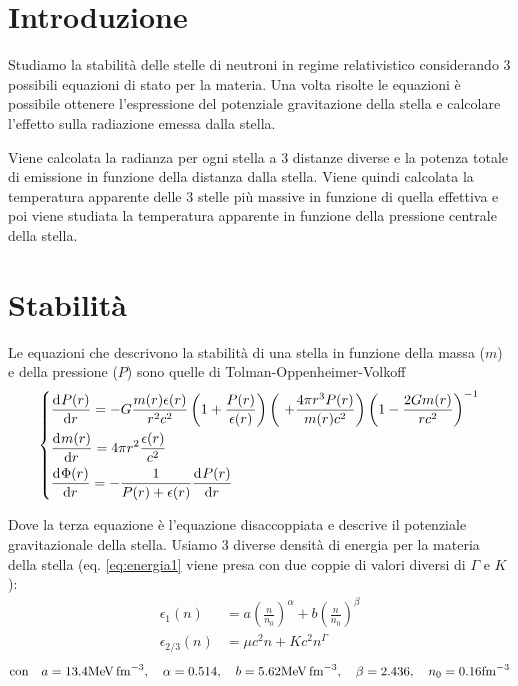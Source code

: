 \documentclass[a4paper, titlepage]{article}
\begin{document}
\section{Introduzione}
Studiamo la stabilità delle stelle di neutroni in regime relativistico considerando 3 possibili equazioni di stato per la materia.
Una volta risolte le equazioni è possibile ottenere l'espressione del potenziale gravitazione della stella e calcolare l'effetto sulla radiazione emessa dalla stella.


Viene calcolata la radianza per ogni stella a 3 distanze diverse e la potenza totale di emissione in funzione della distanza dalla stella.
Viene quindi calcolata la temperatura apparente delle 3 stelle più massive in funzione di quella effettiva e poi viene studiata la temperatura apparente in funzione della pressione centrale della stella.

\section{Stabilità}

Le equazioni che descrivono la stabilità di una stella in funzione della massa ($m$) e della pressione ($P$) sono quelle di Tolman-Oppenheimer-Volkoff
\begin{equation}
    \begin{dcases}
        \dv[]{P(r)}{r} = - G \frac{m(r) \epsilon (r)}{r^2 c^2} \left(1 + \frac{P(r)}{\epsilon (r)} \right) \left(\ + \frac{4 \pi r^3 P(r)}{m(r) c^2} \right) \left(1 - \frac{2 G m(r)}{r c^2} \right)^{-1} \\
        \dv[]{m(r)}{r} = 4 \pi r^2 \frac{\epsilon (r)}{c^2} \\
        \dv[]{\Phi(r)}{r} = - \frac{1}{P(r) + \epsilon (r)} \dv[]{P(r)}{r}
    \end{dcases}
    \label{eq:sistema_corr}
\end{equation}

Dove la terza equazione è l'equazione disaccoppiata e descrive il potenziale gravitazionale della stella.
Usiamo 3 diverse densità di energia per la materia della stella (eq. \ref{eq:energia1} viene presa con due coppie di valori diversi di $\Gamma$ e $K$):
\begin{align}
    \epsilon_1 (n) &= a \left( \frac{n}{n_0} \right) ^{\alpha} + b \left( \frac{n}{n_0} \right) ^{\beta} \\
    \epsilon_{2/3} (n) &= \mu c^2n+Kc^2n^\Gamma
    \label{eq:energia1}
\end{align}
\begin{equation}
    \text{con} \quad a = 13.4 \unit{\mega\electronvolt\per\femto\cubic\meter}, \quad
    \alpha = 0.514, \quad
    b = 5.62 \unit{\mega\electronvolt\per\femto\cubic\meter}, \quad
    \beta = 2.436, \quad
    n_0 = 0.16 \unit{\per\femto\cubic\meter} \\
\end{equation}
\end{document}
